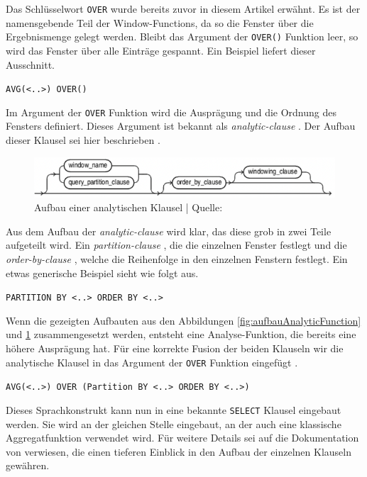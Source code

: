 Das Schlüsselwort \texttt{OVER} wurde bereits zuvor in diesem Artikel erwähnt.
Es ist der namensgebende Teil der Window-Functions, da so die Fenster über die Ergebnismenge
gelegt werden. Bleibt das Argument der \texttt{OVER()} Funktion leer, so wird
das Fenster über alle Einträge gespannt. Ein Beispiel liefert dieser Ausschnitt.

\texttt{AVG(<..>) OVER()} \citep{Nuijten2023}

Im Argument der \texttt{OVER} Funktion wird die Ausprägung und die Ordnung des Fensters
definiert. Dieses Argument ist bekannt als \textit{analytic-clause} \citep{oracle}.
Der Aufbau dieser Klausel sei hier beschrieben \citep{oracle}.
\begin{figure}[h]
	\centering
	\includegraphics[scale=0.5]{img/aufbauAnalyticClausel.jpg}
	\caption{ Aufbau einer analytischen Klausel | Quelle: \citep{oracle}}
	\label{fig:aufbauAnalytischeKlausel}
\end{figure}
Aus dem Aufbau der \textit{analytic-clause} \citep{oracle} wird klar, das diese
grob in zwei Teile aufgeteilt wird. Ein \textit{partition-clause} \citep{oracle},
die die einzelnen Fenster festlegt und die \textit{order-by-clause} \citep{oracle},
welche die Reihenfolge in den einzelnen Fenstern festlegt. Ein etwas generische
Beispiel sieht wie folgt aus.

\texttt{PARTITION BY <..> ORDER BY <..>} \\ \citep[Analytic Functions]{Nuijten2023}

Wenn die gezeigten Aufbauten aus den Abbildungen
\ref{fig:aufbauAnalyticFunction} und \ref{fig:aufbauAnalytischeKlausel}
zusammengesetzt werden, entsteht eine Analyse-Funktion, die bereits eine höhere
Ausprägung hat. Für eine korrekte Fusion der beiden Klauseln wir die analytische
Klausel in das Argument der \texttt{OVER} Funktion eingefügt \citep[Analytic
Functions]{Nuijten2023}.

\texttt{AVG(<..>) OVER (Partition BY <..> ORDER BY <..>)} \\ \citep[Analytic Functions]{Nuijten2023}

Dieses Sprachkonstrukt kann nun in eine bekannte \texttt{SELECT} Klausel eingebaut
werden. Sie wird an der gleichen Stelle eingebaut, an der auch eine klassische Aggregatfunktion
verwendet wird. Für weitere Details sei auf die Dokumentation von \citet{oracle}
verwiesen, die einen tieferen Einblick in den Aufbau der einzelnen Klauseln
gewähren.

